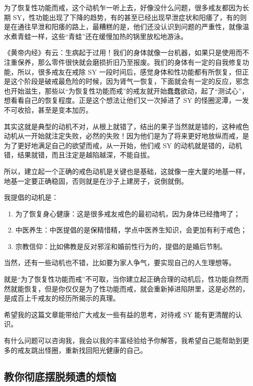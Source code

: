 \documentclass[fontset=founder]{ctexart}
\begin{document}
为了恢复性功能而戒，这个动机乍一听上去，好像没什么问题，很多戒友都因为长期 SY，性功能出现了下降的趋势，有的甚至已经出现早泄症状和阳痿了，有的则是在通往早泄和阳痿的路上，最糟糕的是，他们还没认识到问题的严重性，就像温水煮青蛙一样，这些“青蛙”还在缓慢加热的锅里放松地游泳。

《黄帝内经》有云：生病起于过用！我们的身体就像一台机器，如果只是使用而不注重保养，那么零件很快就会磨损折旧乃至报废。我们的身体有一定的自我修复功能，所以，很多戒友在戒除 SY 一段时间后，感觉身体和性功能都有所恢复，但正是这个阶段是破戒最危险的时候，因为肾气一恢复，下面就会有一定的反应，邪念也开始滋生，那些以“为恢复性功能而戒”的戒友就开始蠢蠢欲动，起了“测试心”，想看看自己的恢复程度。正是这个想法让他们又一次掉进了 SY 的怪圈泥潭，一发不可收拾，甚至是变本加厉。

其实这就是典型的动机不对，从根上就错了，结出的果子当然就是错的，这种戒色动机从一开始就注定失败，必然的失败！因为他们是为了将来更好地放纵而戒，是为了更好地满足自己的欲望而戒，从一开始，他们戒 SY 的动机就是错的，动机错，结果就错，而且注定是越陷越深，不能自拔。

所以，建立起一个正确的戒色动机是关键也是基础，这就像一座大厦的地基一样，地基一定要正确稳固，否则就是在沙子上建房子，说倒就倒。

我提倡的动机是：

\begin{enumerate}
    \item 为了恢复身心健康：这是很多戒友戒色的最初动机，因为身体已经撸垮了；
    \item 中医养生：中医提倡的是保精惜精，学点中医养生知识，会更加有利于戒色；
    \item 宗教信仰：比如佛教是反对邪淫和婚前性行为的，提倡的是婚后节制。
\end{enumerate}

当然，还有一些动机也不错，比如要为家人争气，要实现自己的人生理想等。

就是“为了恢复性功能而戒”不可取，当你建立起正确合理的动机后，性功能自然而然就能恢复，但是你仅仅是为了性功能而戒，就会重新掉进陷阱里，这是必然的，是成百上千戒友的经历所揭示的真理。

希望我的这篇文章能带给广大戒友一些有益的思考，对待戒 SY 能有更清醒的认识。

有什么问题可以咨询我，我会以我的丰富经验给予你解答，我希望自己能帮助到更多的戒友跳出怪圈，重新找回阳光健康的自己。

\subsection{教你彻底摆脱频遗的烦恼}
\end{document}

